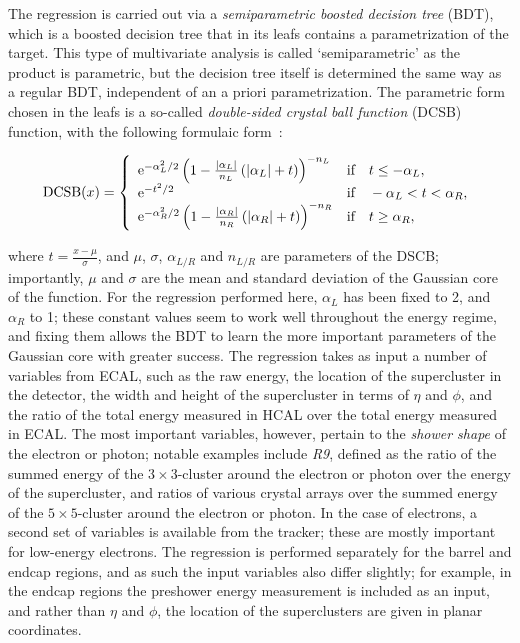 The regression is carried out via a \textit{semiparametric boosted decision tree} (BDT), which is a boosted decision tree that in its leafs contains a parametrization of the target.
% 
This type of multivariate analysis is called `semiparametric' as the product is parametric, but the decision tree itself is determined the same way as a regular BDT, independent of an a priori parametrization.
% 
The parametric form chosen in the leafs is a so-called \textit{double-sided crystal ball function} (DCSB) function, with the following formulaic form~\cite{Aad:2015oqa}:
% 
\begin{linenomath*}
\begin{equation}
\label{eq:dscb}
\text{DCSB}(x) = \left\{
    \begin{array}{ll}
    \mathrm{e}^{-\alpha_L^2/2}
        \left( 1-\frac{\left| \alpha_L \right |}{n_L} \left(\left| \alpha_L \right |+t\right) \right)^{-n_L}
        & \text{if} \quad t \leq -\alpha_L, \\
    \mathrm{e}^{-t^2/2} & \text{if} \quad -\alpha_L < t < \alpha_R, \\
    \mathrm{e}^{-\alpha_R^2/2}
        \left( 1-\frac{\left| \alpha_R \right |}{n_R} \left(\left| \alpha_R \right |+t\right) \right)^{-n_R}
        & \text{if} \quad t \geq \alpha_R, \\
    \end{array}
    \right.
\end{equation}
\end{linenomath*}
% 
where $t = \frac{x-\mu}{\sigma}$, and $\mu$, $\sigma$, $\alpha_{L/R}$ and $n_{L/R}$ are parameters of the DSCB; importantly, $\mu$ and $\sigma$ are the mean and standard deviation of the Gaussian core of the function.
% 
For the regression performed here, $\alpha_L$ has been fixed to 2, and $\alpha_R$ to 1; these constant values seem to work well throughout the energy regime, and fixing them allows the BDT to learn the more important parameters of the Gaussian core with greater success.
% 
The regression takes as input a number of variables from ECAL, such as the raw energy, the location of the supercluster in the detector, the width and height of the supercluster in terms of $\eta$ and $\phi$, and the ratio of the total energy measured in HCAL over the total energy measured in ECAL.
% 
The most important variables, however, pertain to the \textit{shower shape} of the electron or photon; notable examples include \textit{R9}, defined as the ratio of the summed energy of the $3\times3$-cluster around the electron or photon over the energy of the supercluster, and ratios of various crystal arrays over the summed energy of the $5\times5$-cluster around the electron or photon.
% 
In the case of electrons, a second set of variables is available from the tracker; these are mostly important for low-energy electrons.
% 
The regression is performed separately for the barrel and endcap regions, and as such the input variables also differ slightly; for example, in the endcap regions the preshower energy measurement is included as an input, and rather than $\eta$ and $\phi$, the location of the superclusters are given in planar coordinates.


